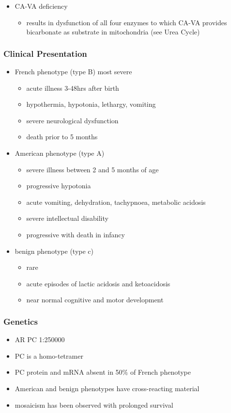 \documentclass[12pt]{scrartcl}
\begin{document}
\begin{itemize}
\begin{itemize}
\item CA-VA deficiency
\begin{itemize}
\item results in dysfunction of all four enzymes to which CA-VA
provides bicarbonate as substrate in mitochondria (see Urea Cycle)
\end{itemize}
\end{itemize}
\end{itemize}

\subsubsection{Clinical Presentation}
\label{sec:org1afc304}
\begin{itemize}
\item French phenotype (type B) most severe
\begin{itemize}
\item acute illness 3-48hrs after birth
\item hypothermia, hypotonia, lethargy, vomiting
\item severe neurological dysfunction
\item death prior to 5 months
\end{itemize}
\item American phenotype (type A)
\begin{itemize}
\item severe illness between 2 and 5 months of age
\item progressive hypotonia
\item acute vomiting, dehydration, tachypnoea, metabolic acidosis
\item severe intellectual disability
\item progressive with death in infancy
\end{itemize}
\item benign phenotype (type c)
\begin{itemize}
\item rare
\item acute episodes of lactic acidosis and ketoacidosis
\item near normal cognitive and motor development
\end{itemize}
\end{itemize}
\subsubsection{Genetics}
\label{sec:org2211d9a}
\begin{itemize}
\item AR PC 1:250000
\item PC is a homo-tetramer
\item PC protein and mRNA absent in 50\% of French phenotype
\item American and benign phenotypes have cross-reacting material
\item mosaicism has been observed with prolonged survival
\end{itemize}
\end{document}
